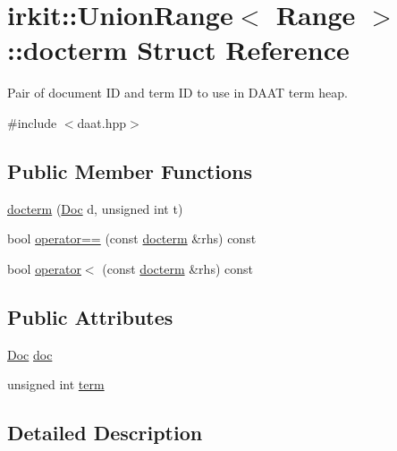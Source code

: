 \hypertarget{structirkit_1_1UnionRange_1_1docterm}{}\section{irkit\+:\+:Union\+Range$<$ Range $>$\+:\+:docterm Struct Reference}
\label{structirkit_1_1UnionRange_1_1docterm}


Pair of document ID and term ID to use in D\+A\+AT term heap.  




{\ttfamily \#include $<$daat.\+hpp$>$}

\subsection*{Public Member Functions}
\begin{DoxyCompactItemize}
\item 
\hyperlink{structirkit_1_1UnionRange_1_1docterm_a5a45bee16d82935e804cf2a0a492a3c5}{docterm} (\hyperlink{classirkit_1_1UnionRange_a387589b1f09868b60485c4ab8c61f97a}{Doc} d, unsigned int t)
\item 
bool \hyperlink{structirkit_1_1UnionRange_1_1docterm_a089cce245934c7558deb5e9405f36e65}{operator==} (const \hyperlink{structirkit_1_1UnionRange_1_1docterm}{docterm} \&rhs) const
\item 
bool \hyperlink{structirkit_1_1UnionRange_1_1docterm_a5f4842c5758933c11d28a00aa5a66262}{operator$<$} (const \hyperlink{structirkit_1_1UnionRange_1_1docterm}{docterm} \&rhs) const
\end{DoxyCompactItemize}
\subsection*{Public Attributes}
\begin{DoxyCompactItemize}
\item 
\hyperlink{classirkit_1_1UnionRange_a387589b1f09868b60485c4ab8c61f97a}{Doc} \hyperlink{structirkit_1_1UnionRange_1_1docterm_a4fe1c3b4721f619f688189d6b5e4afe2}{doc}
\item 
unsigned int \hyperlink{structirkit_1_1UnionRange_1_1docterm_aa8219ac3bc95a63da177aaf0689eaff0}{term}
\end{DoxyCompactItemize}


\subsection{Detailed Description}
